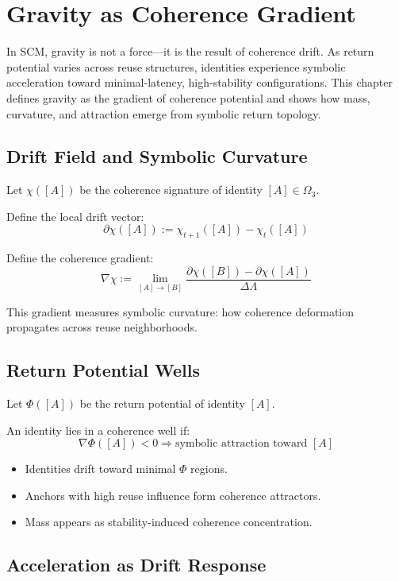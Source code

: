 \chapter{Gravity as Coherence Gradient} \label{chapter-gravity}

In SCM, gravity is not a force—it is the result of coherence drift. As return potential varies across reuse structures, identities experience symbolic acceleration toward minimal-latency, high-stability configurations. This chapter defines gravity as the gradient of coherence potential and shows how mass, curvature, and attraction emerge from symbolic return topology.

\section{Drift Field and Symbolic Curvature} \label{sec:drift-field}

Let $\chi([A])$ be the coherence signature of identity $[A] \in \Omega_3$.

Define the local drift vector:
\[
\partial\chi([A]) := \chi_{t+1}([A]) - \chi_t([A])
\]

Define the coherence gradient:
\[
\nabla\chi := \lim_{[A] \to [B]} \frac{\partial\chi([B]) - \partial\chi([A])}{\Delta \Lambda}
\]

This gradient measures symbolic curvature: how coherence deformation propagates across reuse neighborhoods.

\section{Return Potential Wells} \label{sec:potential-wells}

Let $\Phi([A])$ be the return potential of identity $[A]$.

An identity lies in a coherence well if:
\[
\nabla\Phi([A]) < 0 \Rightarrow \text{symbolic attraction toward } [A]
\]

\begin{itemize}
  \item Identities drift toward minimal $\Phi$ regions.
  \item Anchors with high reuse influence form coherence attractors.
  \item Mass appears as stability-induced coherence concentration.
\end{itemize}

\section{Acceleration as Drift Response} \label{sec:acceleration}


